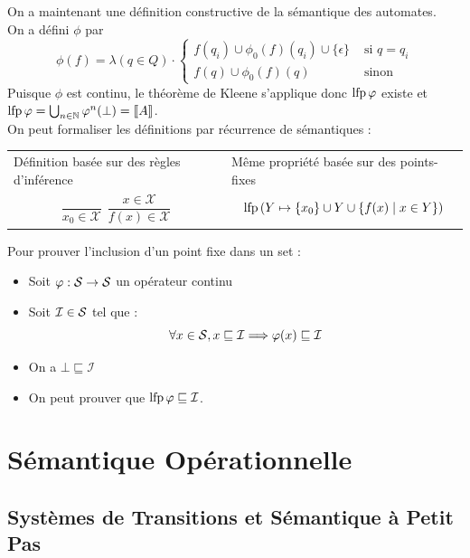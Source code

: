 \documentclass{cours}
\begin{document}
On a maintenant une définition constructive de la sémantique des automates.\\
On a défini $\phi$ par \[
	\phi(f) = \lambda(q \in Q) \cdot \begin{cases}
		f(q_{i}) \cup \phi_{0}(f)(q_{i}) \cup \{\epsilon\} & \text{ si } q = q_{i} \\
		f(q) \cup \phi_{0}(f)(q)                           & \text{ sinon}
	\end{cases}
\]
Puisque $\phi$ est continu, le théorème de Kleene s'applique donc $\operatorname{lfp}\varphi$ existe et $\operatorname{lfp}\varphi = \bigcup_{n \in \mathbb{N}}\varphi^{n}(\bot) = \left\llbracket A \right\rrbracket$.\\

On peut formaliser les définitions par récurrence de sémantiques :
\begin{center}
	\begin{tabular}{m{.3\linewidth}m{.4\linewidth}}
		Définition basée sur des \newline règles d'inférence & Même propriété basée \newline sur des points-fixes \\
		\[
			\frac{}{x_{0} \in \mathcal{X}} \ \ \frac{x \in \mathcal{X}}{f(x) \in \mathcal{X}}
		\]
		                                                     &
		\[
			\operatorname{lfp}\left(Y \mapsto \{x_{0}\} \cup Y \cup \{f(x) \mid x \in Y\}\right)
		\]
	\end{tabular}
\end{center}

Pour prouver l'inclusion d'un point fixe dans un set :
\begin{itemize}
	\item Soit $\varphi : \mathcal{S} \to \mathcal{S}$ un opérateur continu
	\item Soit $\mathcal{I} \in \mathcal{S}$ tel que :
	      \[
		      \forall x \in \mathcal{S}, x \sqsubseteq \mathcal{I} \Longrightarrow \varphi(x) \sqsubseteq \mathcal{I}
	      \]
	\item On a $\bot \sqsubseteq \mathcal{I}$
	\item On peut prouver que $\operatorname{lfp}\varphi \sqsubseteq \mathcal{I}$.
\end{itemize}

\section{Sémantique Opérationnelle}
\subsection{Systèmes de Transitions et Sémantique à Petit Pas}
\end{document}

